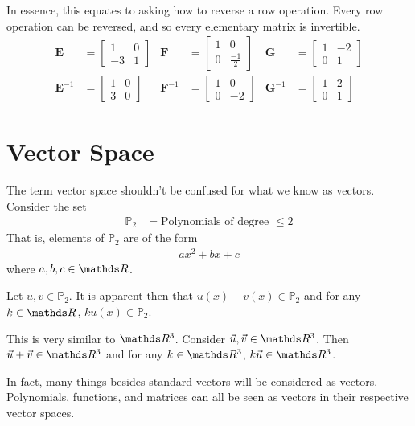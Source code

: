 \documentclass[11pt]{article}
\newcommand{\mat}[1]{\mathbf{#1}}
\newcommand{\vek}[1]{\vec{#1}}
\begin{document}
In essence, this equates to asking how to reverse a row operation. Every row operation can be reversed, and so every elementary matrix is invertible.
\begin{align*}
\mat{E} &= \begin{bmatrix}1 & 0 \\ -3 & 1\end{bmatrix}
&
\mat{F} &= \begin{bmatrix}1 & 0 \\ 0 & \frac{-1}{2}\end{bmatrix}
&
\mat{G} &= \begin{bmatrix}1 & -2 \\ 0 & 1\end{bmatrix}
\\
\mat{E}^{-1} &= \begin{bmatrix}1 & 0 \\ 3 & 0\end{bmatrix}
&
\mat{F}^{-1} &= \begin{bmatrix}1 & 0 \\ 0 & -2\end{bmatrix}
&
\mat{G}^{-1} &= \begin{bmatrix}1 & 2 \\ 0 & 1\end{bmatrix}
\end{align*}

\section*{Vector Space}
The term vector space shouldn't be confused for what we know as vectors. Consider the set
\begin{align*}
\mathbb{P}_2 &= \text{Polynomials of degree $\le 2$}
\end{align*}
That is, elements of $\mathbb{P}_2$ are of the form
\begin{align*}
a x^2 + b x + c
\end{align*}
where $a,b,c \in \bbR$.

Let $u,v \in \mathbb{P}_2$. It is apparent then that $u(x) + v(x) \in \mathbb{P}_2$ and for any $k \in \bbR$, $k u(x) \in \mathbb{P}_2$.

This is very similar to $\bbR^3$. Consider $\vek{u}, \vek{v} \in \bbR^3$. Then $\vek{u} + \vek{v} \in \bbR^3$ and for any $k \in \bbR^3$, $k \vek{u} \in \bbR^3$.

In fact, many things besides standard vectors will be considered as vectors. Polynomials, functions, and matrices can all be seen as vectors in their respective vector spaces.
\end{document}
